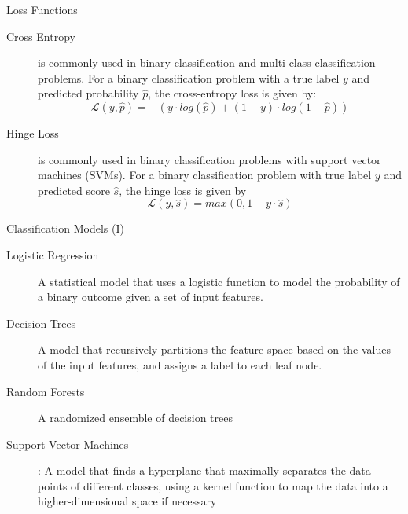 \documentclass[aspectratio=169]{../latex_main/tntbeamer}  %
\begin{document}
    
    \begin{frame}[c]{Loss Functions}

    \begin{description}
        \item[Cross Entropy] is commonly used in binary classification and multi-class classification problems. For a binary classification problem with a true label $y$ and predicted probability $\hat{p}$, the cross-entropy loss is given by:
        $$\mathcal{L}(y,\hat{p}) = - (y \cdot log(\hat{p}) + (1 - y) \cdot log(1 - \hat{p}))$$

        \item[Hinge Loss] is commonly used in binary classification problems with support vector machines (SVMs). For a binary classification problem with true label $y$ and predicted score $\hat{s}$, the hinge loss is given by
        $$\mathcal{L}(y,\hat{s}) = max(0, 1 - y \cdot \hat{s})$$

        \end{description}
    
    \end{frame}

    \begin{frame}[c]{Classification Models (I)}
        \begin{description}
            \item[Logistic Regression] A statistical model that uses a logistic function to model the probability of a binary outcome given a set of input features.
            \item[Decision Trees] A model that recursively partitions the feature space based on the values of the input features, and assigns a label to each leaf node.
            \item[Random Forests] A randomized ensemble of decision trees
            \item[Support Vector Machines]:  A model that finds a hyperplane that maximally separates the data points of different classes, using a kernel function to map the data into a higher-dimensional space if necessary
        \end{description}

    \end{frame}
\end{document}
